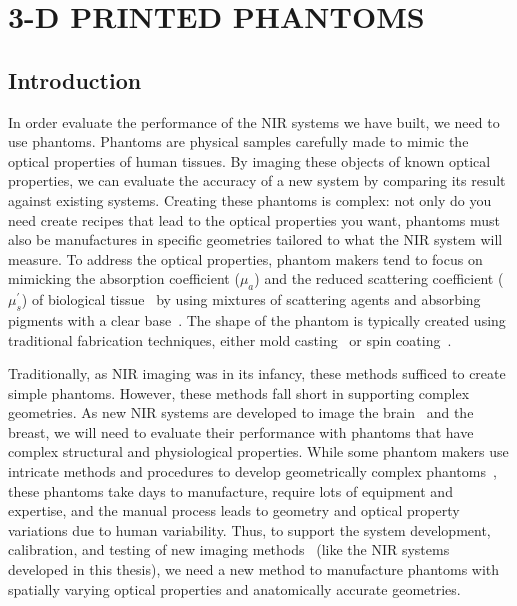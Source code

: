 
\chapter{3-D PRINTED PHANTOMS} %
\label{chap:3dprint}

\section{Introduction}
In order evaluate the performance of the NIR systems we have built, we need to use phantoms. Phantoms are physical samples carefully made to mimic the optical properties of human tissues\cite{Pogue2006}. By imaging these objects of known optical properties, we can evaluate the accuracy of a new system by comparing its result against existing systems. Creating these phantoms is complex: not only do you need create recipes that lead to the optical properties you want, phantoms must also be manufactures in specific geometries tailored to what the NIR system will measure. To address the optical properties, phantom makers tend to focus on mimicking the absorption coefficient ($\mu_a$) and the reduced scattering coefficient ($\mu_s^{'}$) of biological tissue~\cite{Dempsey2017} by using mixtures of scattering agents and absorbing pigments with a clear base~\cite{Hebden1995, Dong2015}. The shape of the phantom is typically created using traditional fabrication techniques, either mold casting~\cite{Hahn2012} or spin coating~\cite{Park2013}. 

Traditionally, as NIR imaging was in its infancy, these methods sufficed to create simple phantoms. However, these methods fall short in supporting complex geometries. As new NIR systems are developed to image the brain~\cite{Hebden2002, Villringer1997} and the breast, we will need to evaluate their performance with phantoms that have complex structural and physiological properties. While some phantom makers use intricate methods and procedures to develop geometrically complex phantoms~\cite{Mobashsher2014}, these phantoms take days to manufacture, require lots of equipment and expertise, and the manual process leads to  geometry and optical property variations due to human variability. Thus, to support the system development, calibration, and testing of new imaging methods~\cite{Cerussi2012, Diep2015} (like the NIR systems developed in this thesis), we need a new method to manufacture phantoms with spatially varying optical properties and anatomically accurate geometries.


